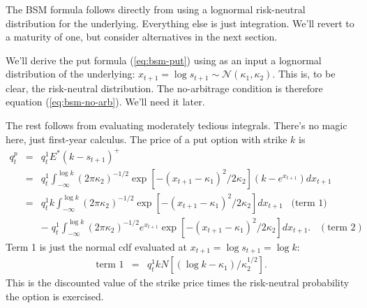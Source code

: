 \documentclass[11pt]{article}
\begin{document}
The BSM formula follows directly from using a lognormal risk-neutral distribution
for the underlying.  Everything else is just integration.
We'll revert to a maturity of one, but consider alternatives in the next section.

We'll derive the put formula (\ref{eq:bsm-put})
using as an input a lognormal distribution
of the underlying:
$x_{t+1} = \log s_{t+1} \sim \mathcal{N} (\kappa_1,\kappa_2)$.
This is, to be clear, the risk-neutral distribution.
The no-arbitrage condition is therefore equation (\ref{eq:bsm-no-arb}).
We'll need it later.

The rest follows from evaluating moderately tedious integrals.
There's no magic here, just first-year calculus.
The price of a put option with strike $k$ is
\begin{eqnarray*}
    q^p_t &=&  q^1_t E^* (k - s_{t+1})^+  \\
            &=& q^1_t \int_{-\infty}^{\log k} (2 \pi \kappa_2)^{-1/2}
                    \exp[ - (x_{t+1} - \kappa_1)^2/2\kappa_2]
                    \left( k - e^{x_{t+1}} \right) d x_{t+1} \\
            &=& q^1_t k \int_{-\infty}^{\log k} (2 \pi \kappa_2)^{-1/2}
                    \exp[ - (x_{t+1} - \kappa_1)^2/2\kappa_2] d x_{t+1}
                    \;\;\; \mbox{(term 1)}\\
            &&    - \; q^1_t \int_{-\infty}^{\log k} (2 \pi \kappa_2)^{-1/2}
                    e^{x_{t+1}} \exp[ - (x_{t+1} - \kappa_1)^2/2\kappa_2] d x_{t+1} .
                     \;\;\; (\mbox{term 2})
\end{eqnarray*}
Term 1 is just the normal cdf evaluated at $x_{t+1} = \log s_{t+1} = \log k$:
\begin{eqnarray*}
    \mbox{term 1} &=&  q^1_t k N [ (\log k - \kappa_1)/\kappa_2^{1/2}] .
\end{eqnarray*}
This is the discounted value of the strike price times
the risk-neutral probability the option is exercised.
\end{document}
